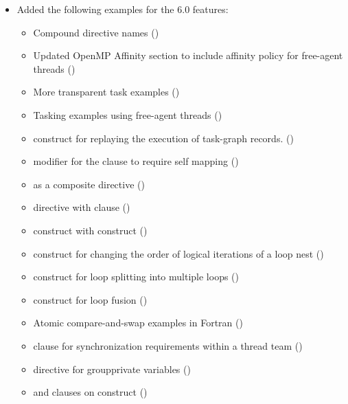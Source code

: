 \begin{itemize}
\item Added the following examples for the 6.0 features:
\begin{itemize}
  \item Compound directive names ()
  \item Updated OpenMP Affinity section to include affinity policy for free-agent threads
    ()
  \item More transparent task examples
    ()
  \item Tasking examples using free-agent threads ()
  \item {} construct for replaying the execution of task-graph records.
    ()
  \item {} modifier for the  clause to require self mapping
    ()
  \item {} as a composite directive 
    ()
  \item {} directive with  clause 
    ()
   \item {} construct with  construct 
    ()
  \item {} construct for changing the order of logical
    iterations of a loop nest ()
  \item {} construct for loop splitting into multiple loops
    ()
  \item {} construct for loop fusion ()
  \item Atomic compare-and-swap examples in Fortran
    ()
  \item {} clause for synchronization requirements within
    a thread team ()
  \item {} directive for groupprivate variables
    ()
  \item {} and  clauses on
     construct ()
\end{itemize}


\end{itemize}
